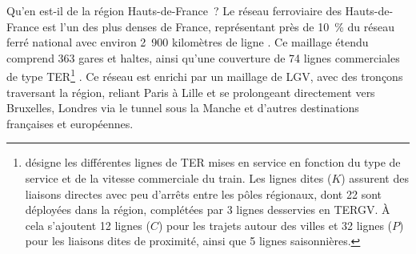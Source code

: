 \begin{refsegment}
Qu'en est-il de la région Hauts-de-France~? Le réseau ferroviaire des Hauts-de-France est l'un des plus denses de France, représentant près de 10~\% du réseau ferré national avec environ 2~900 kilomètres de ligne \textcolor{blue}{\autocites[11]{region_hauts-de-france_planification_2024}[51]{ceser_hauts-de-france_mobilite_2021}}. Ce maillage étendu comprend 363 gares et haltes, ainsi qu'une couverture de 74 lignes commerciales de type \acrshort{TER}\footnote{
    \textcolor{blue}{\textcite[468]{sncf_voyageurs_trains_nodate}} désigne les différentes lignes de \acrshort{TER} mises en service en fonction du type de service et de la vitesse commerciale du train. Les lignes dites  (\(K\)) assurent des liaisons directes avec peu d'arrêts entre les pôles régionaux, dont 22 sont déployées dans la région, complétées par 3 lignes  desservies en \acrfull{TERGV}. À cela s’ajoutent 12 lignes  (\(C\)) pour les trajets autour des villes et 32 lignes  (\(P\)) pour les liaisons dites de proximité, ainsi que 5 lignes saisonnières.
} \textcolor{blue}{\autocite{sncf_reseau_hauts--france_2024}}. Ce réseau est enrichi par un maillage de \acrfull{LGV}, avec des tronçons traversant la région, reliant Paris à Lille et se prolongeant directement vers Bruxelles, Londres via le tunnel sous la Manche et d'autres destinations françaises et européennes.%


\end{refsegment}
